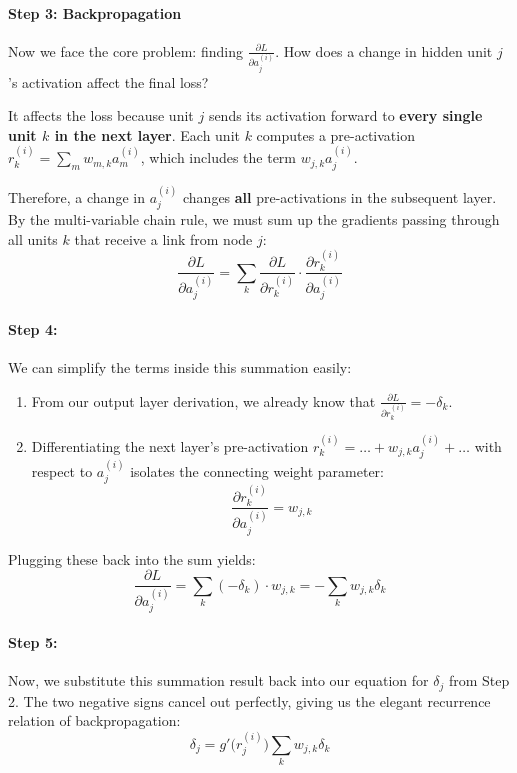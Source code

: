 \paragraph{Step 3: Backpropagation}
Now we face the core problem: finding $\frac{\partial L}{\partial a_j^{(i)}}$. How does a change in hidden unit $j$'s activation affect the final loss? 

It affects the loss because unit $j$ sends its activation forward to \textbf{every single unit $k$ in the next layer}. Each unit $k$ computes a pre-activation $r_k^{(i)} = \sum_{m} w_{m,k} a_m^{(i)}$, which includes the term $w_{j,k} a_j^{(i)}$. 

Therefore, a change in $a_j^{(i)}$ changes \textbf{all} pre-activations in the subsequent layer. By the multi-variable chain rule, we must sum up the gradients passing through all units $k$ that receive a link from node $j$:
\[
\frac{\partial L}{\partial a_j^{(i)}} = \sum_{k} \frac{\partial L}{\partial r_k^{(i)}} \cdot \frac{\partial r_k^{(i)}}{\partial a_j^{(i)}}
\]



\paragraph{Step 4:}
We can simplify the terms inside this summation easily:
\begin{enumerate}
    \item From our output layer derivation, we already know that $\frac{\partial L}{\partial r_k^{(i)}} = -\delta_k$.
    \item Differentiating the next layer's pre-activation $r_k^{(i)} = \dots + w_{j,k} a_j^{(i)} + \dots$ with respect to $a_j^{(i)}$ isolates the connecting weight parameter:
    \[
    \frac{\partial r_k^{(i)}}{\partial a_j^{(i)}} = w_{j,k}
    \]
\end{enumerate}

Plugging these back into the sum yields:
\[
\frac{\partial L}{\partial a_j^{(i)}} = \sum_{k} (-\delta_k) \cdot w_{j,k} = -\sum_{k} w_{j,k} \delta_k
\]

\paragraph{Step 5:}
Now, we substitute this summation result back into our equation for $\delta_j$ from Step 2. The two negative signs cancel out perfectly, giving us the elegant recurrence relation of backpropagation:
\[
\delta_j = g'\big(r_j^{(i)}\big) \sum_{k} w_{j,k} \delta_k
\]

